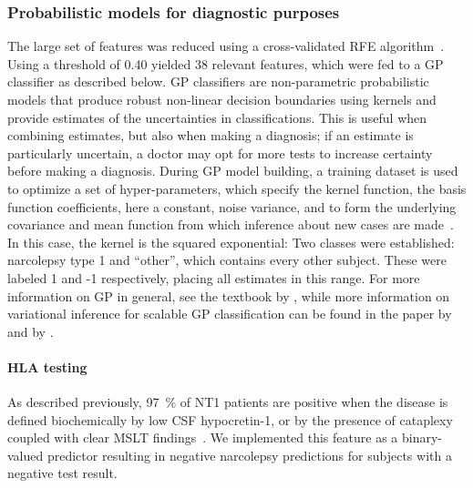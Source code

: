 \subsubsection{Probabilistic models for diagnostic purposes} 
The large set of features was reduced using a cross-validated \ac{RFE} algorithm~\cite{Guyon2002}.
Using a threshold of 0.40 yielded 38 relevant features, which were fed to a \ac{GP} classifier as described below.
\Ac{GP} classifiers are non-parametric probabilistic models that produce robust non-linear decision boundaries using kernels and provide estimates of the uncertainties in classifications.
This is useful when combining estimates, but also when making a diagnosis; if an estimate is particularly uncertain, a doctor may opt for more tests to increase certainty before making a diagnosis.
During \ac{GP} model building, a training dataset is used to optimize a set of hyper-parameters, which specify the kernel function, the basis function coefficients, here a constant, noise variance, and to form the underlying covariance and mean function from which inference about new cases are made~\cite{Rasmussen2006}.
In this case, the kernel is the squared exponential:
Two classes were established: narcolepsy type 1 and “other”, which contains every other subject.
These were labeled 1 and -1 respectively, placing all estimates in this range.
For more information on GP in general, see the textbook by \citeauthor{Rasmussen2006}\cite{Rasmussen2006}, while more information on variational inference for scalable \ac{GP} classification can be found in the paper by \citeauthor{Hensman2015}\cite{Hensman2015} and by \citeauthor{Matthews2017}\cite{Matthews2017}.

\paragraph{HLA testing}
As described previously, \SI{97}{\percent} of \ac{NT1} patients are \hla positive when the disease is defined biochemically by low \ac{CSF} hypocretin-1, or by the presence of cataplexy coupled with clear \ac{MSLT} findings~\cite{Han2014,Andlauer2013}. 
We implemented this feature as a binary-valued predictor resulting in negative narcolepsy predictions for subjects with a negative \hla test result.

